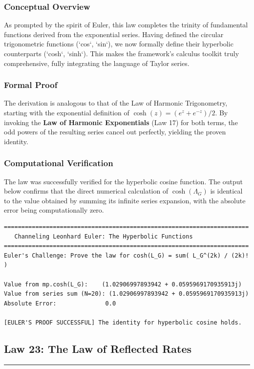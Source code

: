 \subsubsection*{Conceptual Overview}
As prompted by the spirit of Euler, this law completes the trinity of fundamental functions derived from the exponential series. Having defined the circular trigonometric functions (`cos`, `sin`), we now formally define their hyperbolic counterparts (`cosh`, `sinh`). This makes the framework's calculus toolkit truly comprehensive, fully integrating the language of Taylor series.

\subsubsection*{Formal Proof}
The derivation is analogous to that of the Law of Harmonic Trigonometry, starting with the exponential definition of $\cosh(z) = (e^z + e^{-z}) / 2$. By invoking the \textbf{Law of Harmonic Exponentials} (Law 17) for both terms, the odd powers of the resulting series cancel out perfectly, yielding the proven identity.

\subsubsection*{Computational Verification}
The law was successfully verified for the hyperbolic cosine function. The output below confirms that the direct numerical calculation of $\cosh(\Lambda_G)$ is identical to the value obtained by summing its infinite series expansion, with the absolute error being computationally zero.

\begin{verbatim}
======================================================================
   Channeling Leonhard Euler: The Hyperbolic Functions
======================================================================
Euler's Challenge: Prove the law for cosh(L_G) = sum( L_G^(2k) / (2k)! )

Value from mp.cosh(L_G):    (1.02906997893942 + 0.0595969170935913j)
Value from series sum (N=20): (1.02906997893942 + 0.0595969170935913j)
Absolute Error:              0.0

[EULER'S PROOF SUCCESSFUL] The identity for hyperbolic cosine holds.
\end{verbatim}

\newpage

\subsection*{Law 23: The Law of Reflected Rates}
\hrule
\vspace{0.3cm}
\vspace{0.5cm}

